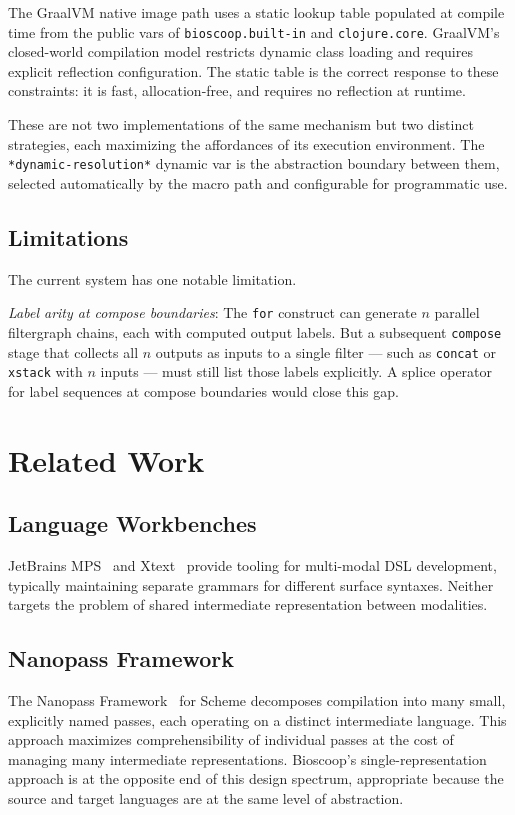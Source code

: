 \documentclass[conference]{IEEEtran}
\begin{document}
The GraalVM native image path uses a static lookup table populated at compile time from the public vars of \texttt{bioscoop.built-in} and \texttt{clojure.core}. GraalVM's closed-world compilation model restricts dynamic class loading and requires explicit reflection configuration. The static table is the correct response to these constraints: it is fast, allocation-free, and requires no reflection at runtime.

These are not two implementations of the same mechanism but two distinct strategies, each maximizing the affordances of its execution environment. The \texttt{*dynamic-resolution*} dynamic var is the abstraction boundary between them, selected automatically by the macro path and configurable for programmatic use.

\subsection{Limitations}

The current system has one notable limitation.

\emph{Label arity at compose boundaries}: The \texttt{for} construct can generate $n$ parallel filtergraph chains, each with computed output labels. But a subsequent \texttt{compose} stage that collects all $n$ outputs as inputs to a single filter --- such as \texttt{concat} or \texttt{xstack} with $n$ inputs --- must still list those labels explicitly. A splice operator for label sequences at compose boundaries would close this gap.

\section{Related Work}

\subsection{Language Workbenches}

JetBrains MPS~\cite{mps} and Xtext~\cite{xtext} provide tooling for multi-modal DSL development, typically maintaining separate grammars for different surface syntaxes. Neither targets the problem of shared intermediate representation between modalities.

\subsection{Nanopass Framework}

The Nanopass Framework~\cite{nanopass} for Scheme decomposes compilation into many small, explicitly named passes, each operating on a distinct intermediate language. This approach maximizes comprehensibility of individual passes at the cost of managing many intermediate representations. Bioscoop's single-representation approach is at the opposite end of this design spectrum, appropriate because the source and target languages are at the same level of abstraction.
\end{document}
